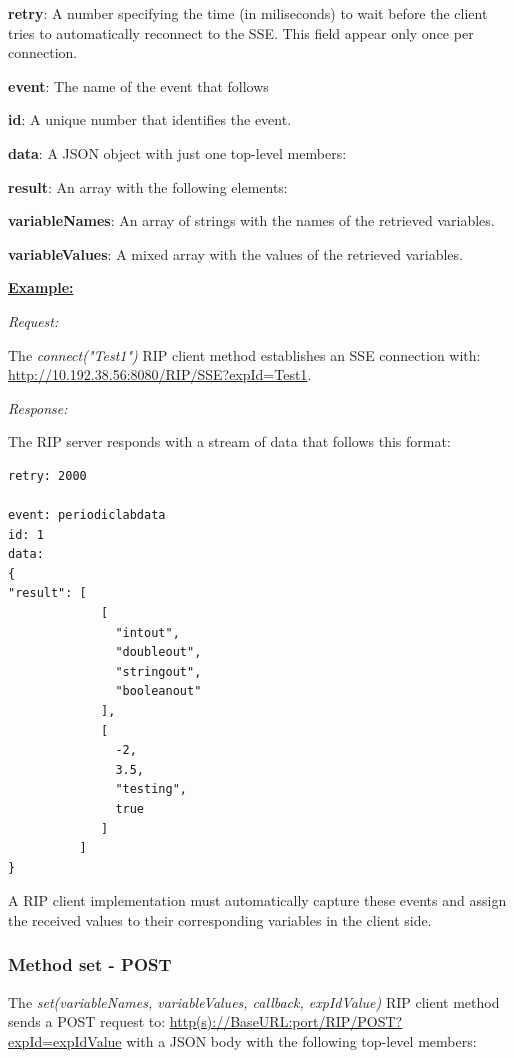 \begin{myEnumerate}
    \item \textbf{retry}: A number specifying the time (in miliseconds) to wait before the client tries to automatically reconnect to the SSE. This field appear only once per connection.
    \item \textbf{event}: The name of the event that follows
    \item \textbf{id}: A unique number that identifies the event.
    \item \textbf{data}: A JSON object with just one top-level members:
    \begin{myEnumerate}
        \item \textbf{result}: An array with the following elements:
        \begin{myEnumerate}
            \item \textbf{variableNames}: An array of strings with the names of the retrieved variables.
            \item \textbf{variableValues}: A mixed array with the values of the retrieved variables.
        \end{myEnumerate}
    \end{myEnumerate}
\end{myEnumerate}

\textbf{\underline{Example:}}

\textit{Request:}

The \textit{connect("Test1")} RIP client method establishes an SSE connection with: \url{http://10.192.38.56:8080/RIP/SSE?expId=Test1}.

\textit{Response:}

The RIP server responds with a stream of data that follows this format:

\begin{lstlisting}
retry: 2000

event: periodiclabdata
id: 1
data: 
{
"result": [
             [
               "intout",
               "doubleout",
               "stringout",
               "booleanout"
             ],
             [
               -2,
               3.5,
               "testing",
               true
             ]
          ]
}
\end{lstlisting}

A RIP client implementation must automatically capture these events and assign the received values to their corresponding variables in the client side.

\subsubsection{Method set - POST}
The \textit{set(variableNames, variableValues, callback, expIdValue)} RIP client method sends a POST request to: \url{http(s)://BaseURL:port/RIP/POST?expId=expIdValue} with a JSON body with the following top-level members:

